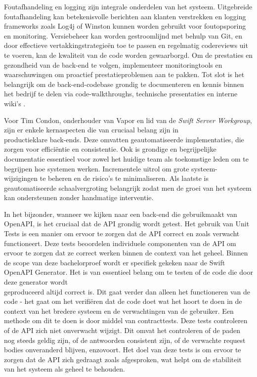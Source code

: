 Foutafhandeling en logging zijn integrale onderdelen van het systeem. Uitgebreide foutafhandeling kan betekenisvolle berichten aan klanten verstrekken en logging frameworks zoals Log4j of Winston kunnen worden gebruikt voor foutopsporing en monitoring. Versiebeheer kan worden gestroomlijnd met behulp van Git, en door effectieve vertakkingstrategieën toe te passen en regelmatig codereviews uit te voeren, kan de kwaliteit van de code worden gewaarborgd. Om de prestaties en gezondheid van de back-end te volgen, implementeer monitoringtools en waarschuwingen om proactief prestatieproblemen aan te pakken. Tot slot is het \\belangrijk om de back-end-codebase grondig te documenteren en kennis binnen het bedrijf te delen via code-walkthroughs, technische presentaties en interne wiki's \autocite{Senthilkumar2023}. 


Voor Tim Condon, onderhouder van Vapor en lid van de \textit{Swift Server Workgroup}, zijn er enkele kernaspecten die van cruciaal belang zijn in \\productieklare back-ends. Deze omvatten geautomatiseerde implementaties, die zorgen voor efficiëntie en consistentie. Ook is grondige en begrijpelijke \\documentatie essentieel voor zowel het huidige team als toekomstige leden om te begrijpen hoe systemen werken.  Incrementele uitrol om grote systeem-\\wijzigingen te beheren en de risico's te minimaliseren. Als laatste is \\geautomatiseerde schaalvergroting belangrijk zodat men de groei van het systeem kan ondersteunen zonder handmatige interventie.

In het bijzonder, wanneer we kijken naar een back-end die gebruikmaakt van OpenAPI, is het cruciaal dat de API grondig wordt getest. Het gebruik van Unit Tests is een manier om ervoor te zorgen dat de API correct en zoals verwacht functioneert. Deze tests beoordelen individuele componenten van de API om ervoor te zorgen dat ze correct werken binnen de context van het geheel.
Binnen de scope van deze bachelorproef wordt er specifiek gekeken naar de Swift OpenAPI Generator. Het is van essentieel belang om te testen of de code die door deze generator wordt \\geproduceerd altijd correct is. Dit gaat verder dan alleen het functioneren van de code - het gaat om het verifiëren dat de code doet wat het hoort te doen in de \\context van het bredere systeem en de verwachtingen van de gebruiker. Een \\methode om dit te doen is door middel van contracttests. Deze tests controleren of de API zich niet onverwacht wijzigt. Dit omvat het controleren of de paden nog steeds geldig zijn, of de antwoorden consistent zijn, of de verwachte request bodies onveranderd blijven, enzovoort. Het doel van deze tests is om ervoor te zorgen dat de API zich gedraagt zoals afgesproken, wat helpt om de stabiliteit van het systeem als geheel te behouden. 

